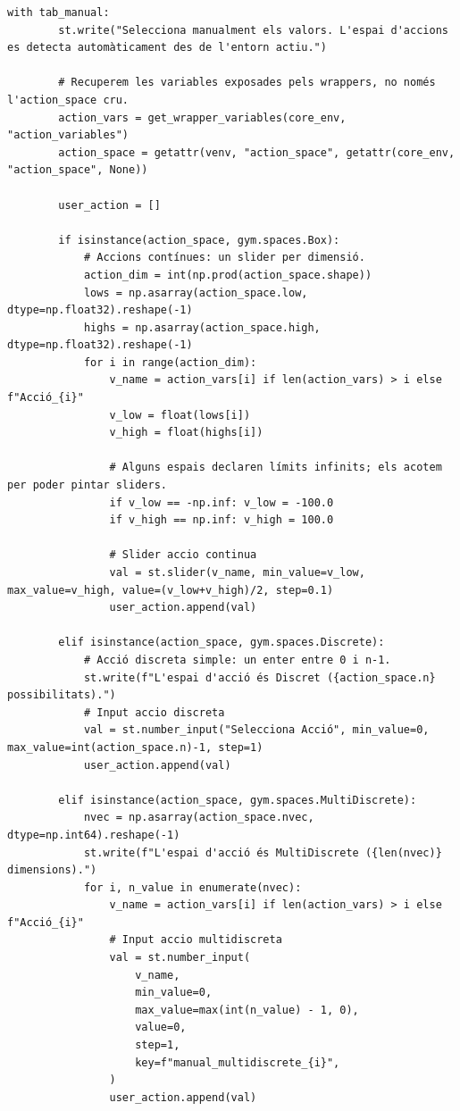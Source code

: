 \documentclass[10pt,a4paper]{article}
\begin{document}
\begin{lstlisting}[style=studioPython,caption={pages/Interaccionar\_amb\_l'Agent.py},label={lst:pages-interaccionar-amb-l-agent-py}]
    with tab_manual:
        st.write("Selecciona manualment els valors. L'espai d'accions es detecta automàticament des de l'entorn actiu.")

        # Recuperem les variables exposades pels wrappers, no només l'action_space cru.
        action_vars = get_wrapper_variables(core_env, "action_variables")
        action_space = getattr(venv, "action_space", getattr(core_env, "action_space", None))

        user_action = []

        if isinstance(action_space, gym.spaces.Box):
            # Accions contínues: un slider per dimensió.
            action_dim = int(np.prod(action_space.shape))
            lows = np.asarray(action_space.low, dtype=np.float32).reshape(-1)
            highs = np.asarray(action_space.high, dtype=np.float32).reshape(-1)
            for i in range(action_dim):
                v_name = action_vars[i] if len(action_vars) > i else f"Acció_{i}"
                v_low = float(lows[i])
                v_high = float(highs[i])

                # Alguns espais declaren límits infinits; els acotem per poder pintar sliders.
                if v_low == -np.inf: v_low = -100.0
                if v_high == np.inf: v_high = 100.0

                # Slider accio continua
                val = st.slider(v_name, min_value=v_low, max_value=v_high, value=(v_low+v_high)/2, step=0.1)
                user_action.append(val)

        elif isinstance(action_space, gym.spaces.Discrete):
            # Acció discreta simple: un enter entre 0 i n-1.
            st.write(f"L'espai d'acció és Discret ({action_space.n} possibilitats).")
            # Input accio discreta
            val = st.number_input("Selecciona Acció", min_value=0, max_value=int(action_space.n)-1, step=1)
            user_action.append(val)

        elif isinstance(action_space, gym.spaces.MultiDiscrete):
            nvec = np.asarray(action_space.nvec, dtype=np.int64).reshape(-1)
            st.write(f"L'espai d'acció és MultiDiscrete ({len(nvec)} dimensions).")
            for i, n_value in enumerate(nvec):
                v_name = action_vars[i] if len(action_vars) > i else f"Acció_{i}"
                # Input accio multidiscreta
                val = st.number_input(
                    v_name,
                    min_value=0,
                    max_value=max(int(n_value) - 1, 0),
                    value=0,
                    step=1,
                    key=f"manual_multidiscrete_{i}",
                )
                user_action.append(val)


\end{lstlisting}
\end{document}
